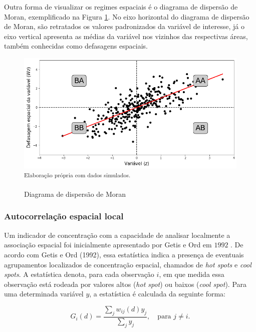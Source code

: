 \documentclass[
	12pt,				%
	openright,			%
	oneside,			%
	a4paper,			%
	chapter=TITLE,		%
	section=TITLE,		%
	english,			%
	french,				%
	spanish,			%
	brazil				%
	]{abntex2}
\begin{document}
Outra forma de visualizar os regimes espaciais é o diagrama de dispersão de Moran, exemplificado na Figura \ref{dispersaomoran}. No eixo horizontal do diagrama de dispersão de Moran, são retratados os valores padronizados da variável de interesse, já o eixo vertical apresenta as médias da variável nos vizinhos das respectivas áreas, também conhecidas como defasagens espaciais. 

\begin{figure}[h!]
	\centering
	\caption{Diagrama de dispersão de Moran}\label{dispersaomoran}
	\includegraphics[scale = 0.4]{img/moran_scatter.png}\\
	\small \textsuperscript {Elaboração própria com dados simulados.}
\end{figure}

\subsubsection{Autocorrelação espacial local}


Um indicador de concentração com a capacidade de analisar localmente a associação espacial foi inicialmente apresentado por Getis e Ord em $1992$ \cite{almeida12}. De acordo com Getis e Ord (1992), essa estatística indica a presença de eventuais agrupamentos localizados de concentração espacial, chamados de \textit{hot spots} e \textit{cool spots}. A estatística  denota, para cada observação $i$, em que medida essa observação está rodeada por valores altos (\textit{hot spot}) ou baixos (\textit{cool spot}). Para uma determinada variável $y$, a estatística é calculada da seguinte forma:

\begin{equation}
G_i(d) = \dfrac{\sum_{j} w_{ij}(d) y_j}{\sum_{j}  y_j},\quad \text{para  $j \neq i$}.
\label{g_getis_ord}
\end{equation}
\end{document}
